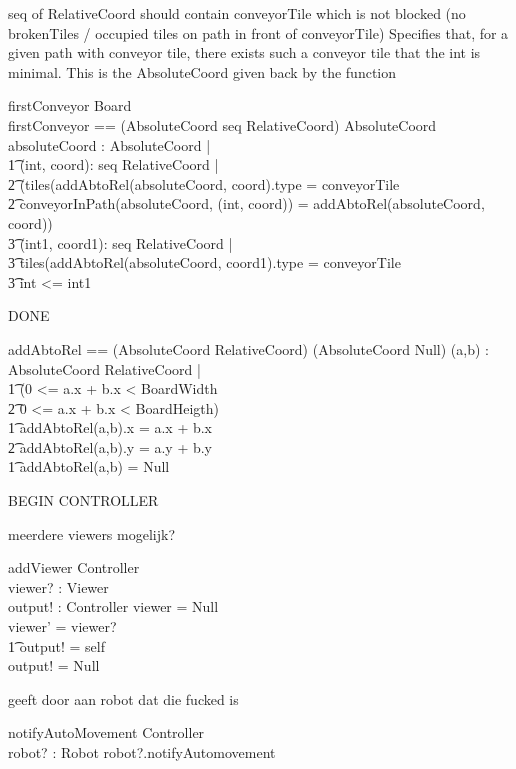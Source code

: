 \documentclass[a4paper,11pt]{article}
\begin{document}
seq of RelativeCoord should contain conveyorTile which is not blocked (no brokenTiles / occupied tiles on path in front of conveyorTile)
Specifies that, for a given path with conveyor tile, there exists such a conveyor tile that the int is minimal. This is the AbsoluteCoord given back by the function
\begin{schema}{firstConveyor}
\Xi Board \\
firstConveyor == (AbsoluteCoord \cross seq RelativeCoord) \rightarrow AbsoluteCoord
\where
\exists absoluteCoord : AbsoluteCoord |  \\ \t1
\exists (int, coord): seq RelativeCoord |  \\ \t2
(tiles(addAbtoRel(absoluteCoord, coord).type = conveyorTile \\ \t2
conveyorInPath(absoluteCoord, (int, coord)) = addAbtoRel(absoluteCoord, coord)) \implies \\ \t3
\forall (int1, coord1): seq RelativeCoord | \\ \t3
\IF tiles(addAbtoRel(absoluteCoord, coord1).type = conveyorTile \\ \t3
\THEN int <= int1
\end{schema}

DONE
\begin{axdef}
addAbtoRel == (AbsoluteCoord \cross RelativeCoord) \rightarrow (AbsoluteCoord \union Null)
\where
\forall (a,b) : AbsoluteCoord \cross RelativeCoord | \\ \t1
\IF (0 <= a.x + b.x < BoardWidth \\ \t2
0 <= a.x + b.x < BoardHeigth) \\ \t1
\THEN
addAbtoRel(a,b).x = a.x + b.x \\ \t2
addAbtoRel(a,b).y = a.y + b.y \\ \t1
\ELSE addAbtoRel(a,b) = Null
\end{axdef}


BEGIN CONTROLLER

meerdere viewers mogelijk?
\begin{schema}{addViewer}
\Delta Controller \\
viewer? : Viewer \\
output! : Controller 
\where
\IF viewer = Null \\
\THEN viewer' = viewer? \\ \t1
output! = self \\
\ELSE output! = Null
\end{schema}


geeft door aan robot dat die fucked is
\begin{schema}{notifyAutoMovement}
\Xi Controller \\
robot? : Robot
\where
robot?.notifyAutomovement
\end{schema}
\end{document}
